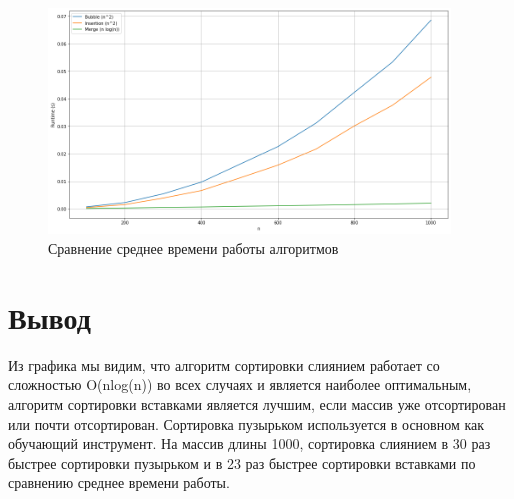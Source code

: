 \begin{figure}[h!]
    \centering
    \includegraphics[width=0.95\textwidth]{3/inc/p4.png}
    \caption{Сравнение среднее времени работы алгоритмов}
\end{figure}



\section{Вывод}

Из графика мы видим, что алгоритм сортировки слиянием работает со сложностью
O(nlog(n)) во всех случаях и является наиболее оптимальным,
алгоритм сортировки вставками является лучшим, если массив уже отсортирован или почти отсортирован.
Сортировка пузырьком используется в основном как обучающий инструмент.
На массив длины 1000, сортировка слиянием в 30 раз быстрее сортировки
пузырьком и в 23 раз быстрее сортировки вставками по сравнению среднее времени работы.
